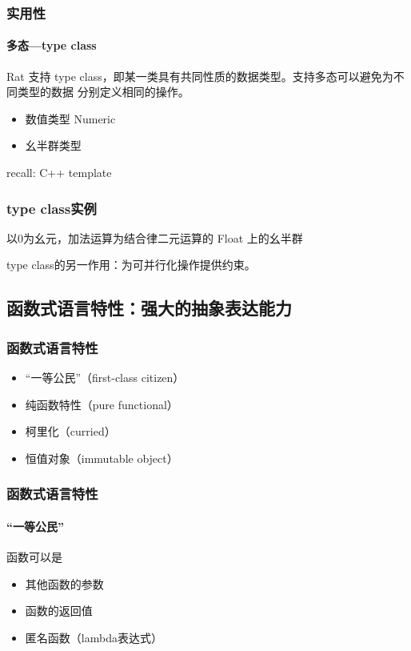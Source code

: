 \documentclass{beamer}
\begin{document}
\begin{frame}
  \frametitle{实用性}
  \framesubtitle{多态---type class}
  Rat 支持 type class，即某一类具有共同性质的数据类型。支持多态可以避免为不同类型的数据
  分别定义相同的操作。
  \begin{itemize}
    \item 数值类型 Numeric
      
    \item 幺半群类型
      
  \end{itemize}
  \pause
  recall: C++ template
  
\end{frame}

\begin{frame}
  \frametitle{type class实例}
  以0为幺元，加法运算为结合律二元运算的 Float 上的幺半群
  
  \pause
  type class的另一作用：为可并行化操作提供约束。
  
\end{frame}

\subsection{函数式语言特性：强大的抽象表达能力}
\begin{frame}
  \frametitle{函数式语言特性}
  \begin{itemize}
    \item “一等公民”（first-class citizen）
    \item 纯函数特性（pure functional）
    \item 柯里化（curried）
    \item 恒值对象（immutable object）
  \end{itemize}
\end{frame}

\begin{frame}
  \frametitle{函数式语言特性}
  \framesubtitle{“一等公民”}
  函数可以是
  \begin{itemize}
    \item<1-> 其他函数的参数
      
    \item<2-> 函数的返回值\\
      
    \item<3-> 匿名函数（lambda表达式）\\
      
  \end{itemize}
\end{frame}
\end{document}
